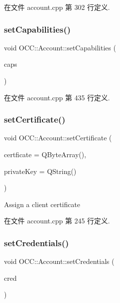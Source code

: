 在文件 account.\+cpp 第 302 行定义.

\mbox{\label{class_o_c_c_1_1_account_ad17669a040e71724454368bcf6516677}} 
\subsubsection{\texorpdfstring{set\+Capabilities()}{setCapabilities()}}
{\footnotesize\ttfamily void O\+C\+C\+::\+Account\+::set\+Capabilities (\begin{DoxyParamCaption}\item[{const Q\+Variant\+Map \&}]{caps }\end{DoxyParamCaption})}



在文件 account.\+cpp 第 435 行定义.

\mbox{\label{class_o_c_c_1_1_account_a91c63e470093cf6e7be3394e0dce1190}} 
\subsubsection{\texorpdfstring{set\+Certificate()}{setCertificate()}}
{\footnotesize\ttfamily void O\+C\+C\+::\+Account\+::set\+Certificate (\begin{DoxyParamCaption}\item[{const Q\+Byte\+Array}]{certficate = {\ttfamily QByteArray()},  }\item[{const Q\+String}]{private\+Key = {\ttfamily QString()} }\end{DoxyParamCaption})}

Assign a client certificate 

在文件 account.\+cpp 第 245 行定义.

\mbox{\label{class_o_c_c_1_1_account_a254e7934695817014f81b6374a49bad5}} 
\subsubsection{\texorpdfstring{set\+Credentials()}{setCredentials()}}
{\footnotesize\ttfamily void O\+C\+C\+::\+Account\+::set\+Credentials (\begin{DoxyParamCaption}\item[{\hyperlink{class_o_c_c_1_1_abstract_credentials}{Abstract\+Credentials} $\ast$}]{cred }\end{DoxyParamCaption})}



